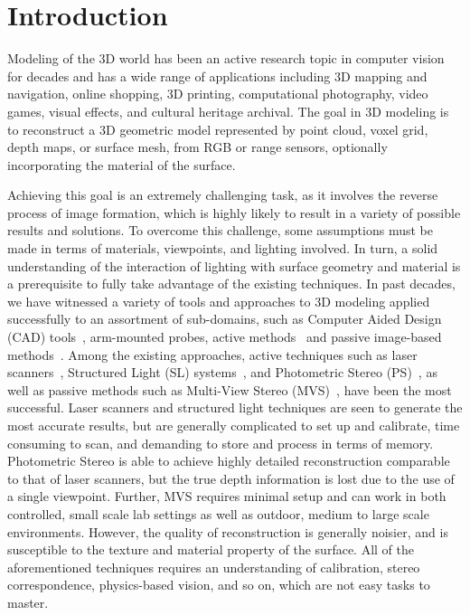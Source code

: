 
\chapter{Introduction}
\label{ch:Introduction}
Modeling of the 3D world has been an active research topic in computer vision for decades and has a wide range of applications including 3D mapping and navigation, online shopping, 3D printing, computational photography, video games, visual effects, and cultural heritage archival. The goal in 3D modeling is to reconstruct a 3D geometric model represented by point cloud, voxel grid, depth maps, or surface mesh, from RGB or range sensors, optionally incorporating the material of the surface.

Achieving this goal is an extremely challenging task, as it involves the reverse process of image formation, which is highly likely to result in a variety of possible results and solutions. To overcome this challenge, some assumptions must be made in terms of materials, viewpoints, and lighting involved. In turn, a solid understanding of the interaction of lighting with surface geometry and material is a prerequisite to fully take advantage of the existing techniques. In past decades, we have witnessed a variety of tools and approaches to 3D modeling applied successfully to an assortment of sub-domains, such as Computer Aided Design (CAD) tools~\cite{CAD}, arm-mounted probes, active methods~\cite{bernardini2002building,levoy2000digital,Lidar,kinect} and passive image-based methods~\cite{kutulakos2000theory,furukawa2010accurate,faugeras2002variational,goesele2006multi}. Among the existing approaches, active techniques such as laser scanners~\cite{levoy2000digital}, Structured Light (SL) systems~\cite{bernardini2002building}, and Photometric Stereo (PS)~\cite{woodham1980photometric}, as well as passive methods such as Multi-View Stereo (MVS)~\cite{seitz2006comparison}, have been the most successful. Laser scanners and structured light techniques are seen to generate the most accurate results, but are generally complicated to set up and calibrate, time consuming to scan, and demanding to store and process in terms of memory. Photometric Stereo is able to achieve highly detailed reconstruction comparable to that of laser scanners, but the true depth information is lost due to the use of a single viewpoint. Further, MVS requires minimal setup and can work in both controlled, small scale lab settings as well as outdoor, medium to large scale environments. However, the quality of reconstruction is generally noisier, and is susceptible to the texture and material property of the surface. All of the aforementioned techniques requires an understanding of calibration, stereo correspondence, physics-based vision, and so on, which are not easy tasks to master.

